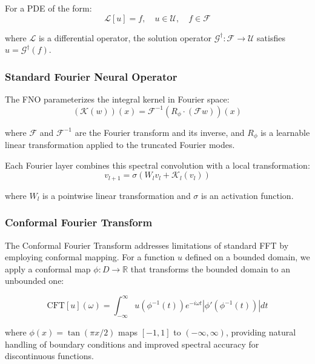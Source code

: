 \documentclass[11pt]{article}
\begin{document}
For a PDE of the form:
\begin{equation}
\mathcal{L}[u] = f, \quad u \in \mathcal{U}, \quad f \in \mathcal{F}
\end{equation}

where $\mathcal{L}$ is a differential operator, the solution operator $\mathcal{G}^\dagger: \mathcal{F} \rightarrow \mathcal{U}$ satisfies $u = \mathcal{G}^\dagger(f)$.

\subsubsection{Standard Fourier Neural Operator}

The FNO parameterizes the integral kernel in Fourier space:
\begin{equation}
(\mathcal{K}(w))(x) = \mathcal{F}^{-1}(R_\phi \cdot (\mathcal{F}w))(x)
\end{equation}

where $\mathcal{F}$ and $\mathcal{F}^{-1}$ are the Fourier transform and its inverse, and $R_\phi$ is a learnable linear transformation applied to the truncated Fourier modes.

Each Fourier layer combines this spectral convolution with a local transformation:
\begin{equation}
v_{l+1} = \sigma(W_l v_l + \mathcal{K}_l(v_l))
\end{equation}

where $W_l$ is a pointwise linear transformation and $\sigma$ is an activation function.

\subsubsection{Conformal Fourier Transform}

The Conformal Fourier Transform addresses limitations of standard FFT by employing conformal mapping. For a function $u$ defined on a bounded domain, we apply a conformal map $\phi: D \rightarrow \mathbb{R}$ that transforms the bounded domain to an unbounded one:

\begin{equation}
\text{CFT}[u](\omega) = \int_{-\infty}^{\infty} u(\phi^{-1}(t)) e^{-i\omega t} |\phi'(\phi^{-1}(t))| dt
\end{equation}

where $\phi(x) = \tan(\pi x/2)$ maps $[-1,1]$ to $(-\infty,\infty)$, providing natural handling of boundary conditions and improved spectral accuracy for discontinuous functions.
\end{document}
